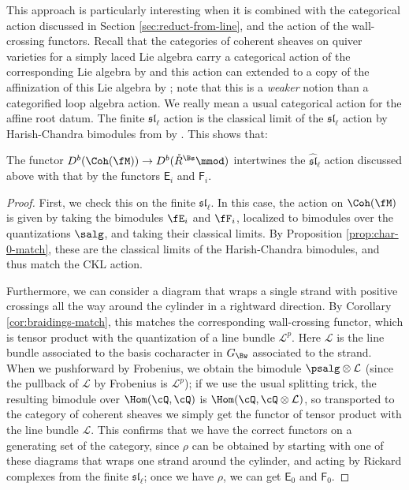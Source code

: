 This approach is particularly interesting when it is combined with the
categorical action discussed in Section \ref{sec:reduct-from-line},
and the
action of the wall-crossing functors.  Recall that the categories of
coherent sheaves on quiver varieties for a simply laced Lie algebra
carry a categorical action of the corresponding Lie algebra by
\cite{CKLquiver} and this action can extended to a copy of the
affinization of this Lie algebra by \cite{??}; note that this is a
{\it weaker} notion than a categorified loop algebra action.  We
really mean a usual categorical action for the affine root datum.
The finite $\mathfrak{sl}_\ell$ action is the classical limit of the
$\mathfrak{sl}_\ell$ action by Harish-Chandra bimodules from \cite{Webcatq} by
\cite{CDK}.  This shows that:
\begin{theorem}\label{thm:char-p-match}
  The functor $D^b(\Coh(\fM))\to D^b(\mathring{R}^{\Bs}\mmod)$
  intertwines the $\mathfrak{\widehat{sl}}_\ell$ action discussed
  above with that by the functors $\mathsf{E}_i$ and $\mathsf{F}_i$.   
\end{theorem}
\begin{proof}
  First, we check this on the finite $\mathfrak{sl}_\ell$.  In this
  case, the action on $\Coh(\fM)$ is given by taking the bimodules
  $\fE_i$ and $\fF_i$, localized to bimodules over the quantizations
  $\salg$, and taking their classical limits.  By Proposition
  \ref{prop:char-0-match}, these are the classical limits of the
  Harish-Chandra bimodules, and thus match the CKL action.  

  Furthermore, we can consider a diagram that wraps a single
  strand with positive crossings all the way around the
  cylinder in a rightward direction.  By Corollary
  \ref{cor:braidings-match}, this matches the corresponding
  wall-crossing functor, which is tensor product with the quantization
  of a line bundle $\mathcal{L}^p$. Here $\mathcal{L}$ is the line
  bundle associated to the basis cocharacter in $G_{\Bw}$ associated
  to the strand.  When we pushforward by Frobenius, we obtain the
  bimodule $\psalg\otimes \mathcal{L}$ (since the pullback of
  $\mathcal{L}$ by Frobenius is $\mathcal{L}^p$); if we use the usual
  splitting trick, the resulting bimodule over $\Hom(\cQ,\cQ)$ is
  $\Hom(\cQ,\cQ\otimes \mathcal{L})$, so transported to the category
  of coherent sheaves we simply get the functor of tensor product with
  the line bundle $\mathcal{L}$.  This confirms that we have the
  correct functors on a generating set of the category, since $\rho$
  can be obtained by starting with one of these diagrams that wraps
  one strand around the cylinder, and acting by Rickard complexes from
  the finite $\mathfrak{sl}_\ell$; once we have $\rho$, we can get
  $\mathsf{E}_0$ and $\mathsf{F}_0$.
\end{proof}
